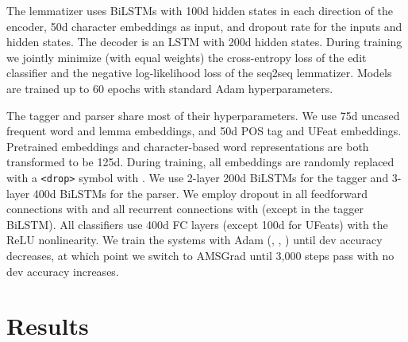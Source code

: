 \documentclass[11pt,a4paper]{article}
\begin{document}
The lemmatizer uses BiLSTMs with 100d hidden states in each direction of the encoder, 50d character embeddings as input, and dropout rate  for the inputs and hidden states.
The decoder is an LSTM with 200d hidden states.
During training we jointly minimize (with equal weights) the cross-entropy loss of the edit classifier and the negative log-likelihood loss of the seq2seq lemmatizer.
Models are trained up to 60 epochs with standard Adam hyperparameters.

The tagger and parser share most of their hyperparameters.
We use 75d uncased frequent word and lemma embeddings, and 50d POS tag and UFeat embeddings.
Pretrained embeddings and character-based word representations are both transformed to be 125d.
During training, all embeddings are randomly replaced with a \texttt{<drop>} symbol with .
We use 2-layer 200d BiLSTMs for the tagger and 3-layer 400d BiLSTMs for the parser.
We employ dropout in all feedforward connections with  and all recurrent connections \citep{gal2016dropout} with  (except  in the tagger BiLSTM).
All classifiers use 400d FC layers (except 100d for UFeats) with the ReLU nonlinearity.
We train the systems with Adam (, , ) until dev accuracy decreases, at which point we switch to AMSGrad \citep{reddi2018convergence} until 3,000 steps pass with no dev accuracy increases.
 
\section{Results}
\end{document}
